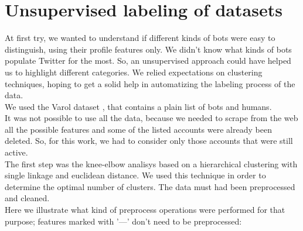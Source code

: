 \section{Unsupervised labeling of datasets}
At first try, we wanted to understand if different kinds of bots were easy to distinguish, using their profile features only. We didn't know what kinds of bots populate Twitter for the most. So, an unsupervised approach could have helped us to highlight different categories. We relied expectations on clustering techniques, hoping to get a solid help in automatizing the labeling process of the data.\\
We used the Varol dataset \cite{Varol}, that contains a plain list of bots and humans.\\
It was not possible to use all the data, because we needed to scrape from the web all the possible features and some of the listed accounts were already been deleted. So, for this work, we had to consider only those accounts that were still active.\\
The first step was the knee-elbow analisys based on a hierarchical clustering with single linkage and euclidean distance. We used this technique in order to determine the optimal number of clusters. The data must had been preprocessed and cleaned.\\
Here we illustrate what kind of preprocess operations were performed for that purpose; features marked with '---' don't need to be preprocessed:


